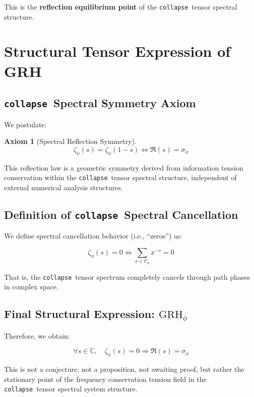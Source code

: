 \documentclass[12pt,a4paper]{article}
\theoremstyle{plain}
\theoremstyle{definition}
\newtheorem{axiom}[theorem]{Axiom}
\theoremstyle{remark}
\newcommand{\collapse}{\texttt{collapse}}
\newcommand{\Cphi}{\mathcal{C}_\phi}
\newcommand{\C}{\mathbb{C}}
\begin{document}
This is the \textbf{reflection equilibrium point} of the \collapse\ tensor spectral structure.

\section{Structural Tensor Expression of GRH}

\subsection{\collapse\ Spectral Symmetry Axiom}

We postulate:

\begin{axiom}[Spectral Reflection Symmetry]
\begin{equation}
\zeta_\phi(s) = \zeta_\phi(1 - s) \iff \Re(s) = \sigma_\phi
\end{equation}
\end{axiom}

This reflection law is a geometric symmetry derived from information tension conservation within the \collapse\ tensor spectral structure, independent of external numerical analysis structures.

\subsection{Definition of \collapse\ Spectral Cancellation}

We define spectral cancellation behavior (i.e., ``zeros'') as:

\begin{equation}
\zeta_\phi(s) = 0 \iff \sum_{x \in \Cphi} x^{-s} = 0
\end{equation}

That is, the \collapse\ tensor spectrum completely cancels through path phases in complex space.

\subsection{Final Structural Expression: $\text{GRH}_\phi$}

Therefore, we obtain:

\begin{equation}
\boxed{
\forall s \in \C, \quad \zeta_\phi(s) = 0 \Rightarrow \Re(s) = \sigma_\phi
}
\end{equation}

This is not a conjecture, not a proposition, not awaiting proof, but rather the stationary point of the frequency conservation tension field in the \collapse\ tensor spectral system structure.
\end{document}
